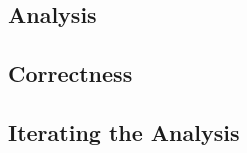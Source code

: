 \documentclass[11pt,a4paper]{article}
\begin{document}
\subsection{Analysis}

\CodeLiveExpr

\subsection{Correctness}

\subsection{Iterating the Analysis}
\end{document}
